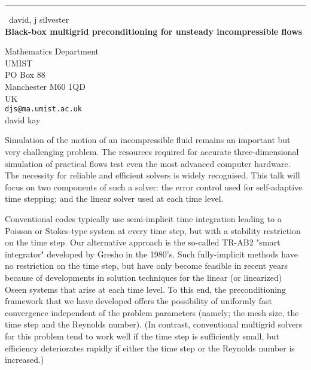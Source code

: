 \documentclass{report}
\begin{document}
\begin{center}
\rule{6in}{1pt} \
{\large david, j silvester \\
{\bf Black-box multigrid preconditioning for unsteady incompressible flows}}

Mathematics Department  \\ UMIST \\ PO Box 88 \\ Manchester M60 1QD \\ UK
\\
{\tt djs@ma.umist.ac.uk}\\
david kay\end{center}

Simulation of the motion of an incompressible fluid remains an
important but very challenging problem. The resources required for
accurate three-dimensional simulation of practical flows test even
the most advanced computer hardware. The necessity for reliable
and efficient solvers is widely recognised. This talk will focus
on two components of such a solver: the error control used for
self-adaptive time stepping; and the linear solver used at each
time level.

Conventional codes typically use semi-implicit time integration
leading to a Poisson or Stokes-type system at every time step, but
with a stability restriction on the time step. Our alternative
approach is the so-called TR-AB2 "smart integrator" developed by
Gresho in the 1980's. Such fully-implicit methods have no
restriction on the time step, but have only become feasible in
recent years because of developments in solution techniques for
the linear (or linearized) Oseen systems that arise at each time
level. To this end, the preconditioning framework that we have
developed offers the possibility of uniformly fast convergence
independent of the problem parameters (namely; the mesh size,
the time step and the Reynolds number). (In contrast, conventional
multigrid solvers for this problem tend to work well if the time
step is sufficiently small, but efficiency deteriorates rapidly
if either the time step or the Reynolds number is increased.)
\end{document}
